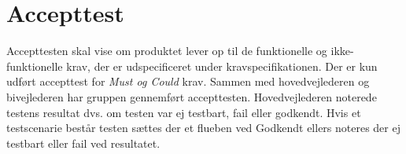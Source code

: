 \pagebreak
\section{Accepttest}
Accepttesten skal vise om produktet lever op til de funktionelle og ikke-funktionelle krav, der er udspecificeret under kravspecifikationen. Der er kun udført accepttest for \textit{Must og Could} krav.  Sammen med hovedvejlederen og bivejlederen har gruppen gennemført accepttesten. Hovedvejlederen noterede testens resultat dvs. om testen var ej testbart, fail eller godkendt. Hvis et testscenarie består testen sættes der et flueben ved Godkendt ellers noteres der ej testbart eller fail ved resultatet.  